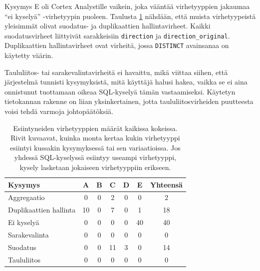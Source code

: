 Kysymys E oli Cortex Analystille vaikein, joka vääntää virhetyyppien jakaumaa ``ei kyselyä'' -virhetyypin puoleen. Taulusta \ref{tb:errors} nähdään, että muista virhetyypeistä yleisimmät olivat suodatus- ja duplikaattien hallintavirheet. Kaikki suodatusvirheet liittyivät sarakkeisiin \texttt{direction} ja \texttt{direction\_original}. Duplikaattien hallintavirheet ovat virheitä, jossa \texttt{DISTINCT} avainsanaa on käytetty väärin.

Taululiitos- tai sarakevalintavirheitä ei havaittu, mikä viittaa siihen, että järjestelmä tunnisti kysymyksistä, mitä käyttäjä halusi hakea, vaikka se ei aina onnistunut tuottamaan oikeaa SQL-kyselyä tämän vastaamiseksi. Käytetyn tietokannan rakenne on liian yksinkertainen, jotta taululiitosvirheiden puutteesta voisi tehdä varmoja johtopäätöksiä.

\begin{table}[h]
  \centering
  \caption{Esiintyneiden virhetyyppien määrät kaikissa kokeissa. Rivit kuvaavat, kuinka monta kertaa kukin virhetyyppi esiintyi kussakin kysymyksessä tai sen variaatioissa. Jos yhdessä SQL-kyselyssä esiintyy useampi virhetyyppi, kysely lasketaan jokaiseen virhetyyppiin erikseen.}
  \label{tb:errors}
  \setlength{\tabcolsep}{4pt}
  \begin{tabular}{lcccccc}
    \toprule
    Kysymys & A & B & C & D & E & Yhteensä\\
    \midrule
    Aggregaatio & 0 & 0 & 2  & 0 & 0  & 2 \\
    Duplikaattien hallinta & 10 & 0 & 7 & 0 & 1 & 18 \\
    Ei kyselyä & 0 & 0 & 0 & 0 & 40 & 40 \\
    Sarakevalinta & 0 & 0 & 0 & 0 & 0 & 0 \\
    Suodatus & 0 & 0 & 11  & 3 & 0  & 14 \\
    Taululiitos & 0 & 0 & 0 & 0 & 0 & 0 \\
    \bottomrule
  \end{tabular}
\end{table}

